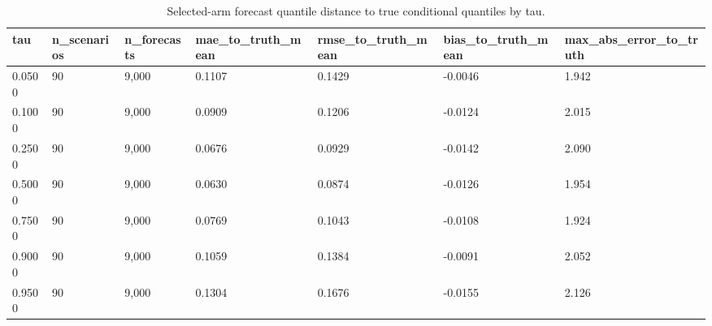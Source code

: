 \begin{table}[t]
\centering
\small
\begin{tabular}{@{}lllllll@{}}
\toprule
tau & n\_scenarios & n\_forecasts & mae\_to\_truth\_mean & rmse\_to\_truth\_mean & bias\_to\_truth\_mean & max\_abs\_error\_to\_truth
\\
\midrule
0.0500 & 90 & 9,000 & 0.1107 & 0.1429 & -0.0046 & 1.942 \\
0.1000 & 90 & 9,000 & 0.0909 & 0.1206 & -0.0124 & 2.015 \\
0.2500 & 90 & 9,000 & 0.0676 & 0.0929 & -0.0142 & 2.090 \\
0.5000 & 90 & 9,000 & 0.0630 & 0.0874 & -0.0126 & 1.954 \\
0.7500 & 90 & 9,000 & 0.0769 & 0.1043 & -0.0108 & 1.924 \\
0.9000 & 90 & 9,000 & 0.1059 & 0.1384 & -0.0091 & 2.052 \\
0.9500 & 90 & 9,000 & 0.1304 & 0.1676 & -0.0155 & 2.126 \\
\bottomrule
\end{tabular}
\caption{Selected-arm forecast quantile distance to true conditional quantiles by tau.}
\label{tab:joint-qvp-phase4k-truth-by-tau}
\end{table}
